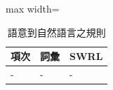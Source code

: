 \begin{table}[htbp]
\centering
\caption{語意到自然語言之規則}
\label{tab:semanticToText}
\begin{adjustbox}{max width=\textwidth}
\renewcommand{\arraystretch}{1.4}
\begin{tabular}{>{\centering\arraybackslash}m{1cm} >{\centering\arraybackslash}m{3cm} >{\centering\arraybackslash}m{14cm} }
\toprule
項次 & 詞彙 & SWRL \\ 
\toprule
- & - & - \\ \midrule
\bottomrule
\end{tabular}
\end{adjustbox}
\end{table}